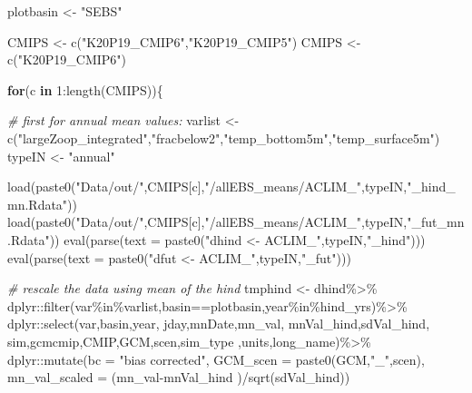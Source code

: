 \documentclass[
]{article}
\newenvironment{Shaded}{\begin{snugshade}}{\end{snugshade}}
\newcommand{\AttributeTok}[1]{\textcolor[rgb]{0.77,0.63,0.00}{#1}}
\newcommand{\CommentTok}[1]{\textcolor[rgb]{0.56,0.35,0.01}{\textit{#1}}}
\newcommand{\ControlFlowTok}[1]{\textcolor[rgb]{0.13,0.29,0.53}{\textbf{#1}}}
\newcommand{\DecValTok}[1]{\textcolor[rgb]{0.00,0.00,0.81}{#1}}
\newcommand{\FunctionTok}[1]{\textcolor[rgb]{0.00,0.00,0.00}{#1}}
\newcommand{\NormalTok}[1]{#1}
\newcommand{\OtherTok}[1]{\textcolor[rgb]{0.56,0.35,0.01}{#1}}
\newcommand{\SpecialCharTok}[1]{\textcolor[rgb]{0.00,0.00,0.00}{#1}}
\newcommand{\StringTok}[1]{\textcolor[rgb]{0.31,0.60,0.02}{#1}}
\begin{document}
\begin{Shaded}
\begin{Highlighting}[]
\NormalTok{    plotbasin }\OtherTok{\textless{}{-}} \StringTok{"SEBS"}
    
\NormalTok{    CMIPS }\OtherTok{\textless{}{-}} \FunctionTok{c}\NormalTok{(}\StringTok{"K20P19\_CMIP6"}\NormalTok{,}\StringTok{"K20P19\_CMIP5"}\NormalTok{)}
\NormalTok{    CMIPS }\OtherTok{\textless{}{-}} \FunctionTok{c}\NormalTok{(}\StringTok{"K20P19\_CMIP6"}\NormalTok{)}
    
    \ControlFlowTok{for}\NormalTok{(c }\ControlFlowTok{in} \DecValTok{1}\SpecialCharTok{:}\FunctionTok{length}\NormalTok{(CMIPS))\{}
      
      \CommentTok{\# first for annual mean values:}
\NormalTok{      varlist }\OtherTok{\textless{}{-}} \FunctionTok{c}\NormalTok{(}\StringTok{"largeZoop\_integrated"}\NormalTok{,}\StringTok{"fracbelow2"}\NormalTok{,}\StringTok{"temp\_bottom5m"}\NormalTok{,}\StringTok{"temp\_surface5m"}\NormalTok{)}
\NormalTok{      typeIN }\OtherTok{\textless{}{-}} \StringTok{"annual"}
       
      \FunctionTok{load}\NormalTok{(}\FunctionTok{paste0}\NormalTok{(}\StringTok{"Data/out/"}\NormalTok{,CMIPS[c],}\StringTok{"/allEBS\_means/ACLIM\_"}\NormalTok{,typeIN,}\StringTok{"\_hind\_mn.Rdata"}\NormalTok{))}
      \FunctionTok{load}\NormalTok{(}\FunctionTok{paste0}\NormalTok{(}\StringTok{"Data/out/"}\NormalTok{,CMIPS[c],}\StringTok{"/allEBS\_means/ACLIM\_"}\NormalTok{,typeIN,}\StringTok{"\_fut\_mn.Rdata"}\NormalTok{))}
      \FunctionTok{eval}\NormalTok{(}\FunctionTok{parse}\NormalTok{(}\AttributeTok{text =} \FunctionTok{paste0}\NormalTok{(}\StringTok{"dhind \textless{}{-} ACLIM\_"}\NormalTok{,typeIN,}\StringTok{"\_hind"}\NormalTok{)))}
      \FunctionTok{eval}\NormalTok{(}\FunctionTok{parse}\NormalTok{(}\AttributeTok{text =} \FunctionTok{paste0}\NormalTok{(}\StringTok{"dfut  \textless{}{-} ACLIM\_"}\NormalTok{,typeIN,}\StringTok{"\_fut"}\NormalTok{)))}
      
       \CommentTok{\# rescale the data using mean of the hind}
\NormalTok{       tmphind    }\OtherTok{\textless{}{-}}\NormalTok{ dhind}\SpecialCharTok{\%\textgreater{}\%}
\NormalTok{         dplyr}\SpecialCharTok{::}\FunctionTok{filter}\NormalTok{(var}\SpecialCharTok{\%in\%}\NormalTok{varlist,basin}\SpecialCharTok{==}\NormalTok{plotbasin,year}\SpecialCharTok{\%in\%}\NormalTok{hind\_yrs)}\SpecialCharTok{\%\textgreater{}\%}
\NormalTok{         dplyr}\SpecialCharTok{::}\FunctionTok{select}\NormalTok{(var,basin,year, jday,mnDate,mn\_val, }
\NormalTok{                       mnVal\_hind,sdVal\_hind, sim,gcmcmip,CMIP,GCM,scen,sim\_type ,units,long\_name)}\SpecialCharTok{\%\textgreater{}\%}
\NormalTok{         dplyr}\SpecialCharTok{::}\FunctionTok{mutate}\NormalTok{(}\AttributeTok{bc =} \StringTok{"bias corrected"}\NormalTok{,}
                       \AttributeTok{GCM\_scen =} \FunctionTok{paste0}\NormalTok{(GCM,}\StringTok{"\_"}\NormalTok{,scen),}
                       \AttributeTok{mn\_val\_scaled =}\NormalTok{ (mn\_val}\SpecialCharTok{{-}}\NormalTok{mnVal\_hind )}\SpecialCharTok{/}\FunctionTok{sqrt}\NormalTok{(sdVal\_hind))}
       

\end{Highlighting}
\end{Shaded}
\end{document}
